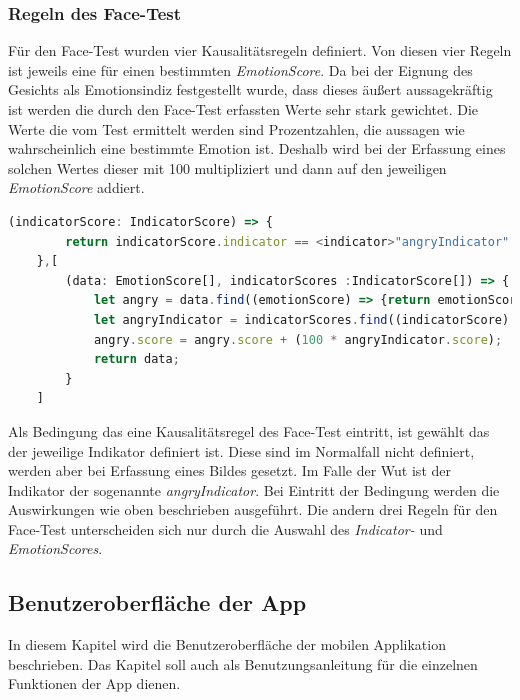 \subsubsection{Regeln des Face-Test}
Für den Face-Test wurden vier Kausalitätsregeln definiert. Von diesen vier Regeln ist jeweils eine für einen bestimmten \textit{EmotionScore}. Da bei der Eignung des Gesichts als Emotionsindiz festgestellt wurde, dass dieses äußert aussagekräftig ist werden die durch den Face-Test erfassten Werte sehr stark gewichtet. Die Werte die vom Test ermittelt werden sind Prozentzahlen, die aussagen wie wahrscheinlich eine bestimmte Emotion ist. Deshalb wird bei der Erfassung eines solchen Wertes dieser mit 100 multipliziert und dann auf den jeweiligen \textit{EmotionScore} addiert. \newline
\begin{lstlisting}[caption={Kausalitätsregel basierend auf Face-Test für Emotion Wut}, language=JavaScript]
	(indicatorScore: IndicatorScore) => {
		return indicatorScore.indicator == <indicator>"angryIndicator" && indicatorScore.score != undefined;    
	},[
		(data: EmotionScore[], indicatorScores :IndicatorScore[]) => {
			let angry = data.find((emotionScore) => {return emotionScore.emotion == <emotion>"angry"});
			let angryIndicator = indicatorScores.find((indicatorScore) => {return indicatorScore.indicator == <indicator>"angryIndicator"});
			angry.score = angry.score + (100 * angryIndicator.score);
			return data;
		}
	]
\end{lstlisting}
Als Bedingung das eine Kausalitätsregel des Face-Test eintritt, ist gewählt das der jeweilige Indikator definiert ist. Diese sind im Normalfall nicht definiert, werden aber bei Erfassung eines Bildes gesetzt. Im Falle der Wut ist der Indikator der sogenannte \textit{angryIndicator}. Bei Eintritt der Bedingung werden die Auswirkungen wie oben beschrieben ausgeführt. Die andern drei Regeln für den Face-Test unterscheiden sich nur durch die Auswahl des \textit{Indicator-} und \textit{EmotionScores}. \newline \newline
\subsection{Benutzeroberfläche der App}
In diesem Kapitel wird die Benutzeroberfläche der mobilen Applikation beschrieben. Das Kapitel soll auch als Benutzungsanleitung für die einzelnen Funktionen der App dienen.
